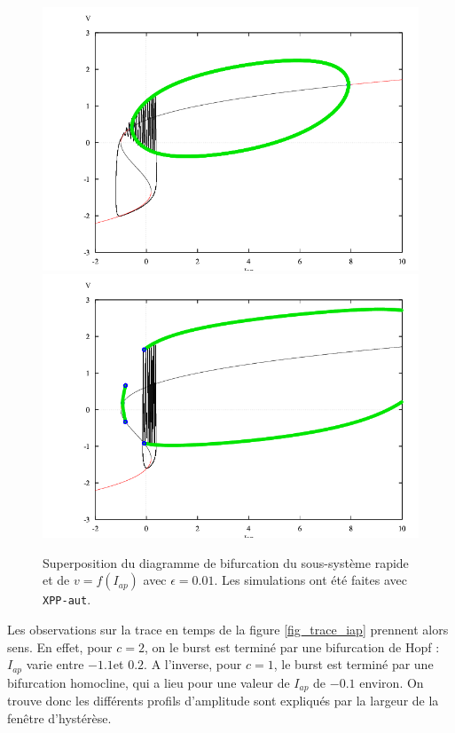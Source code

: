 \documentclass[12pt,a4paper,onecolumn]{article}
\begin{document}
\begin{figure}[H]
	\begin{center}
		\includegraphics[width = 0.9\linewidth]{superpositionC2.png} \includegraphics[width = 0.9\linewidth]{superpositionC1.png}
	\end{center}
	\caption{Superposition du diagramme de bifurcation du sous-système rapide et de $v=f(I_{ap})$ avec $\epsilon = 0.01$. Les simulations ont été faites avec \texttt{XPP-aut}.}
	\label{super_diag}
\end{figure}

Les observations sur la trace en temps de la figure \ref{fig_trace_iap} prennent alors sens. En effet, pour $c=2$, on le burst est terminé par une bifurcation de Hopf : $I_{ap}$ varie entre $-1.1$et $0.2$. A l'inverse, pour $c=1$, le burst est terminé par une bifurcation homocline, qui a lieu pour une valeur de $I_{ap}$ de $-0.1$ environ. On trouve donc les différents profils d'amplitude sont expliqués par la largeur de la fenêtre d'hystérèse.
\end{document}
